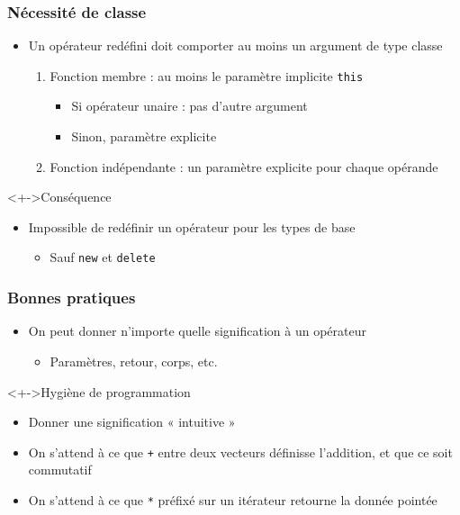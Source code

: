 \begin{frame}
\frametitle{Nécessité de classe}
\begin{itemize}[<+->]
\item Un opérateur redéfini doit comporter au moins un argument de type classe
	\begin{enumerate}
	\item Fonction membre : au moins le paramètre implicite \lstinline|this|
		\begin{itemize}
		\item Si opérateur unaire : pas d'autre argument
		\item Sinon, paramètre explicite
		\end{itemize}
	\item Fonction indépendante : un paramètre explicite pour chaque opérande
	\end{enumerate}
\end{itemize}
\begin{alertblock}<+->{Conséquence}
	\begin{itemize}[<+->]
	\item Impossible de redéfinir un opérateur pour les types de base
		\begin{itemize}
		\item Sauf \lstinline|new| et \lstinline|delete|
		\end{itemize}
	\end{itemize}
\end{alertblock}
\end{frame}

\begin{frame}
\frametitle{Bonnes pratiques}
\begin{itemize}[<+->]
\item On peut donner n'importe quelle signification à un opérateur
	\begin{itemize}
	\item Paramètres, retour, corps, etc.
	\end{itemize}
\end{itemize}
\begin{block}<+->{Hygiène de programmation}
	\begin{itemize}[<+->]
	\item Donner une signification « intuitive »	
	\end{itemize}
\end{block}
\begin{itemize}[<+->]
\item On s'attend à ce que \texttt{+} entre deux vecteurs définisse l'addition, et que ce soit commutatif
\item On s'attend à ce que \texttt{*} préfixé sur un itérateur retourne la donnée pointée
\end{itemize}
\end{frame}

